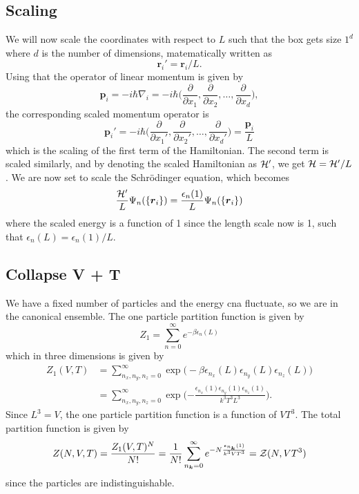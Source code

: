 \documentclass[norsk,a4paper,12pt]{article}
\begin{document}
\subsection{Scaling}
We will now scale the coordinates with respect to $L$ such that the box gets size $1^d$ where $d$ is the number of dimensions, matematically written as
\begin{equation}
\boldsymbol{r}_i'=\boldsymbol{r}_i/L.
\end{equation}
Using that the operator of linear momentum is given by 
\begin{equation}
\boldsymbol{p}_i=-i\hbar\nabla_i=-i\hbar\Big(\frac{\partial}{\partial x_1},\frac{\partial}{\partial x_2},\hdots,\frac{\partial}{\partial x_d}\Big),
\end{equation}
the corresponding scaled momentum operator is 
\begin{equation}
\boldsymbol{p}_i'=-i\hbar\Big(\frac{\partial}{\partial x_1'},\frac{\partial}{\partial x_2'},\hdots,\frac{\partial}{\partial x_d'}\Big)= \frac{\boldsymbol{p}_i}{L}
\end{equation}
which is the scaling of the first term of the Hamiltonian. The second term is scaled similarly, and by denoting the scaled Hamiltonian as ${\cal H}'$, we get ${\cal H}={\cal H}'/L$. We are now set to scale the Schrödinger equation, which becomes
\begin{equation}
\frac{{\cal H}'}{L}\Psi_n(\{\boldsymbol{r}_i\})=\frac{\epsilon_n(1)}{L}\Psi_n(\{\boldsymbol{r}_i\})
\end{equation}
where the scaled energy is a function of 1 since the length scale now is 1, such that $\epsilon_n(L)=\epsilon_n(1)/L$.

\subsection{Collapse V + T}
We have a fixed number of particles and the energy cna fluctuate, so we are in the canonical ensemble. The one particle partition function is given by
\begin{equation}
Z_1=\sum_{n=0}^{\infty}e^{-\beta\epsilon_n(L)}
\end{equation}
which in three dimensions is given by
\begin{align}
Z_1(V,T)&=\sum_{n_x,n_y,n_z=0}^{\infty}\exp{\big(-\beta\epsilon_{n_x}(L)\epsilon_{n_y}(L)\epsilon_{n_z}(L)}\big)\\
&=\sum_{n_x,n_y,n_z=0}^{\infty}\exp\Big({-\frac{\epsilon_{n_x}(1)\epsilon_{n_y}(1)\epsilon_{n_z}(1)}{k^3T^3L^3}}\Big).
\end{align}
Since $L^3=V$, the one particle partition function is a function of $VT^3$. The total partition function is given by 
\begin{equation}
Z(N,V,T)=\frac{Z_1(V,T)^N}{N!}=\frac{1}{N!}\sum_{n_{\boldsymbol{k}}=0}^{\infty}e^{-N\frac{\epsilon_{n_{\boldsymbol{k}}}(1)}{k^3VT^3}}={\cal Z}(N,VT^3)
\end{equation}
since the particles are indistinguishable.
\end{document}
